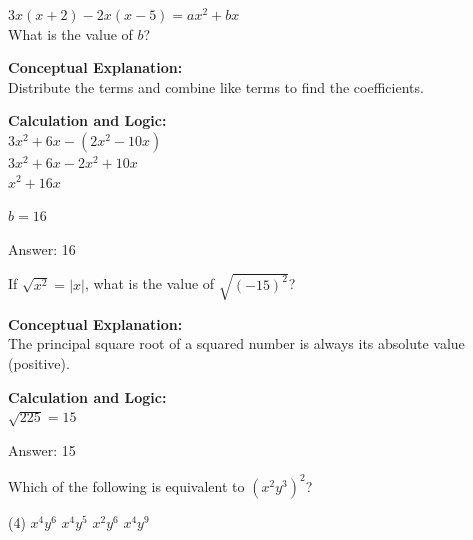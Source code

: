 \documentclass[11pt,paper=a4,answers]{exam}
\begin{document}
\begin{questions}
\question
$3x(x + 2) - 2x(x - 5) = ax^2 + bx$ \\
What is the value of $b$?

\begin{solution}
\textbf{Conceptual Explanation:} \\
Distribute the terms and combine like terms to find the coefficients.

\vspace{20pt}

\textbf{Calculation and Logic:} \\
$3x^2 + 6x - (2x^2 - 10x)$ \\
$3x^2 + 6x - 2x^2 + 10x$ \\
$x^2 + 16x$

\vspace{10pt}

$b = 16$

\vspace{25pt}

Answer: \colorbox{yellow!100}{16}
\end{solution}

\vspace{40pt}

\question
If $\sqrt{x^2} = |x|$, what is the value of $\sqrt{(-15)^2}$?

\begin{solution}
\textbf{Conceptual Explanation:} \\
The principal square root of a squared number is always its absolute value (positive).

\vspace{20pt}

\textbf{Calculation and Logic:} \\
$\sqrt{225} = 15$

\vspace{25pt}

Answer: \colorbox{yellow!100}{15}
\end{solution}

\vspace{40pt}

\question
Which of the following is equivalent to $(x^2y^3)^2$?
\begin{tasks}(4)
    \task $x^4y^6$
    \task $x^4y^5$
    \task $x^2y^6$
    \task $x^4y^9$
\end{tasks}


\end{questions}
\end{document}
